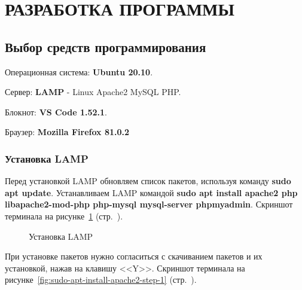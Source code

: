 \newpage

\section{РАЗРАБОТКА ПРОГРАММЫ}

\subsection{Выбор средств программирования}

Операционная система: \textbf{Ubuntu 20.10}.

Сервер: \textbf{LAMP} - Linux Apache2 MySQL PHP.

Блокнот: \textbf{VS Code 1.52.1}.

Браузер: \textbf{Mozilla Firefox 81.0.2}

\subsubsection*{Установка LAMP}

Перед установкой LAMP обновляем список пакетов, используя команду \textbf{sudo apt update}. Устанавливаем LAMP командой \textbf{sudo apt install apache2 php libapache2-mod-php php-mysql mysql-server phpmyadmin}.
Скриншот терминала на рисунке~\ref{fig:sudo-apt-install-apache2} (стр.~\pageref{fig:sudo-apt-install-apache2}).

\begin{figure}[p]
    \caption{Установка LAMP}
    \label{fig:sudo-apt-install-apache2}
\end{figure}

При установке пакетов нужно согласиться с скачиванием пакетов и их установкой, нажав на клавишу <<Y>>.
Скриншот терминала на рисунке~\ref{fig:sudo-apt-install-apache2-step-1} (стр.~\pageref{fig:sudo-apt-install-apache2-step-1}).

